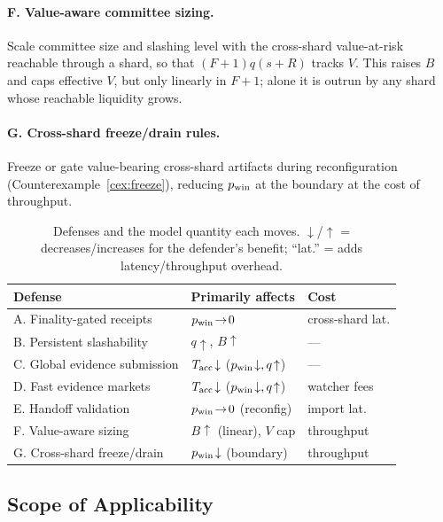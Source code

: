 \paragraph{F. Value-aware committee sizing.}
Scale committee size and slashing level with the cross-shard value-at-risk reachable through a shard,
so that $(F{+}1)q(s{+}R)$ tracks $V$. This raises $B$ and caps effective $V$, but only linearly in
$F{+}1$; alone it is outrun by any shard whose reachable liquidity grows.

\paragraph{G. Cross-shard freeze/drain rules.}
Freeze or gate value-bearing cross-shard artifacts during reconfiguration
(Counterexample~\ref{cex:freeze}), reducing $p_{\mathrm{win}}$ at the boundary at the cost of throughput.

\begin{table}[t]
\centering
\caption{Defenses and the model quantity each moves. $\downarrow$/$\uparrow$ = decreases/increases for
the defender's benefit; ``lat.'' = adds latency/throughput overhead.}
\label{tab:defenses}
\small
\begin{tabularx}{\linewidth}{@{}lXX@{}}
\toprule
Defense & Primarily affects & Cost \\
\midrule
A. Finality-gated receipts      & $p_{\mathrm{win}}\!\to\!0$            & cross-shard lat. \\
B. Persistent slashability      & $q\!\uparrow$, $B\!\uparrow$ & --- \\
C. Global evidence submission   & $T_{\mathrm{acc}}\!\downarrow$ ($p_{\mathrm{win}}\!\downarrow,q\!\uparrow$) & --- \\
D. Fast evidence markets        & $T_{\mathrm{acc}}\!\downarrow$ ($p_{\mathrm{win}}\!\downarrow,q\!\uparrow$) & watcher fees \\
E. Handoff validation           & $p_{\mathrm{win}}\!\to\!0$ (reconfig) & import lat. \\
F. Value-aware sizing           & $B\!\uparrow$ (linear), $V$ cap & throughput \\
G. Cross-shard freeze/drain     & $p_{\mathrm{win}}\!\downarrow$ (boundary) & throughput \\
\bottomrule
\end{tabularx}
\end{table}

\subsection{Scope of Applicability}
\label{sec:applicability}

